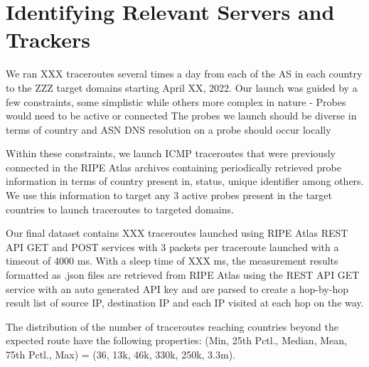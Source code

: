 \section{Identifying Relevant Servers and Trackers}
We ran XXX traceroutes several times a day from each of the AS in each country to the ZZZ target domains starting April XX, 2022. Our launch was guided by a few constraints, some simplistic while others more complex in nature - 
Probes would need to be active or connected
The probes we launch should be diverse in terms of country and ASN
DNS resolution on a probe should occur locally

Within these constraints, we launch ICMP traceroutes that were previously connected in the RIPE Atlas archives containing periodically retrieved probe information in terms of country present in, status, unique identifier among others. We use this information to target any 3 active probes  present in the target countries to launch traceroutes to targeted domains.

Our final dataset contains XXX traceroutes launched using RIPE Atlas REST API GET and POST services with 3 packets per traceroute launched with a timeout of 4000 ms. With a sleep time of XXX ms, the measurement results formatted as .json files are retrieved from RIPE Atlas using the REST API GET service with an auto generated API key and are parsed to create a hop-by-hop result list of source IP, destination IP and each IP visited at each hop on the way.

The distribution of the number of traceroutes reaching countries beyond the expected route have the following properties: (Min, 25th Pctl., Median, Mean, 75th Pctl., Max) = (36, 13k, 46k, 330k, 250k, 3.3m). 

